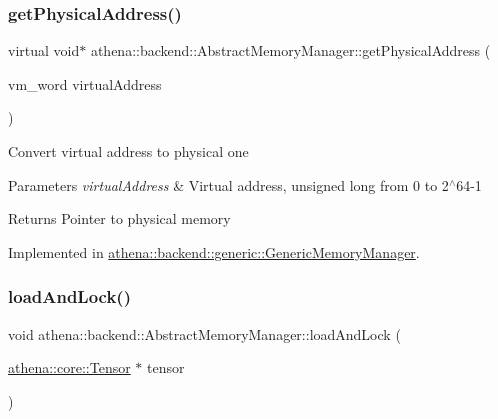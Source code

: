 \subsubsection{\texorpdfstring{get\+Physical\+Address()}{getPhysicalAddress()}}
{\footnotesize\ttfamily virtual void$\ast$ athena\+::backend\+::\+Abstract\+Memory\+Manager\+::get\+Physical\+Address (\begin{DoxyParamCaption}\item[{vm\+\_\+word}]{virtual\+Address }\end{DoxyParamCaption})\hspace{0.3cm}{\ttfamily [pure virtual]}}

Convert virtual address to physical one 
\begin{DoxyParams}{Parameters}
{\em virtual\+Address} & Virtual address, unsigned long from 0 to 2$^\wedge$64-\/1 \\
\hline
\end{DoxyParams}
\begin{DoxyReturn}{Returns}
Pointer to physical memory 
\end{DoxyReturn}


Implemented in \mbox{\hyperlink{classathena_1_1backend_1_1generic_1_1_generic_memory_manager_a7f3dacb56bd95b837910441d0aef1dd8}{athena\+::backend\+::generic\+::\+Generic\+Memory\+Manager}}.

\mbox{\label{classathena_1_1backend_1_1_abstract_memory_manager_a2bbfba2a5104aab3068d46214a6ae7df}} 
\subsubsection{\texorpdfstring{load\+And\+Lock()}{loadAndLock()}\hspace{0.1cm}{\footnotesize\ttfamily [1/3]}}
{\footnotesize\ttfamily void athena\+::backend\+::\+Abstract\+Memory\+Manager\+::load\+And\+Lock (\begin{DoxyParamCaption}\item[{\mbox{\hyperlink{classathena_1_1core_1_1_tensor}{athena\+::core\+::\+Tensor}} $\ast$}]{tensor }\end{DoxyParamCaption})}

